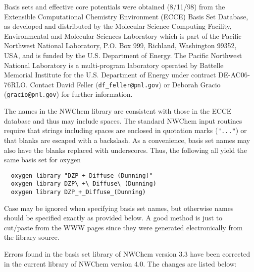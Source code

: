 \label{sec:knownbasis}

Basis sets and effective core potentials were obtained (8/11/98) from
the Extensible Computational Chemistry Environment (ECCE) Basis Set
Database, as developed and distributed by the Molecular Science
Computing Facility, Environmental and Molecular Sciences Laboratory
which is part of the Pacific Northwest National Laboratory, P.O. Box
999, Richland, Washington 99352, USA, and is funded by the
U.S. Department of Energy.  The Pacific Northwest National Laboratory
is a multi-program laboratory operated by Battelle Memorial Institute
for the U.S. Department of Energy under contract DE-AC06-76RLO.
Contact David Feller (\verb+df_feller@pnl.gov+) or Deborah Gracio
(\verb+gracio@pnl.gov+) for further information.

The names in the NWChem library are consistent with those in the ECCE
database and thus may include spaces.  The standard NWChem input
routines require that strings including spaces are enclosed in
quotation marks (\verb+"..."+) or that blanks are escaped with a
backslash.  As a convenience, basis set names may also have the blanks
replaced with underscores.  Thus, the following all yield the same
basis set for oxygen
\begin{verbatim}
  oxygen library "DZP + Diffuse (Dunning)"
  oxygen library DZP\ +\ Diffuse\ (Dunning)
  oxygen library DZP_+_Diffuse_(Dunning)
\end{verbatim}

Case may be ignored when specifying basis set names, but otherwise
names should be specified exactly as provided below.  A good method is
just to cut/paste from the WWW pages since they were generated
electronically from the library source.

Errors found in the basis set library of NWChem version 3.3 have been corrected in 
the current library of NWChem version 4.0. The changes are listed below:

